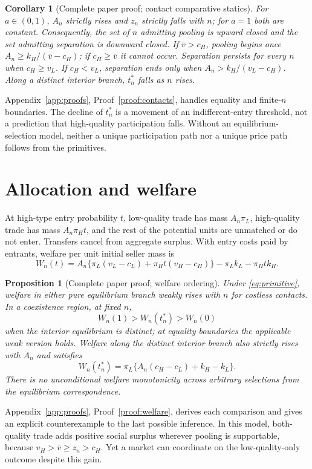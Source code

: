 \documentclass[11pt]{article}
\newtheorem{proposition}{Proposition}
\newtheorem{corollary}{Corollary}
\begin{document}
\begin{corollary}[Complete paper proof; contact comparative statics]\label{cor:contacts}
For $a\in(0,1)$, $A_n$ strictly rises and $z_n$ strictly falls with $n$; for $a=1$ both are constant. Consequently, the set of $n$ admitting pooling is upward closed and the set admitting separation is downward closed. If $\bar v>c_H$, pooling begins once $A_n\geq k_H/(\bar v-c_H)$; if $c_H\geq\bar v$ it cannot occur. Separation persists for every $n$ when $c_H\geq v_L$. If $c_H<v_L$, separation ends only when $A_n>k_H/(v_L-c_H)$. Along a distinct interior branch, $t_n^*$ falls as $n$ rises.
\end{corollary}
Appendix~\ref{app:proofs}, Proof~\ref{proof:contacts}, handles equality and finite-$n$ boundaries. The decline of $t_n^*$ is a movement of an indifferent-entry threshold, not a prediction that high-quality participation falls. Without an equilibrium-selection model, neither a unique participation path nor a unique price path follows from the primitives.

\section{Allocation and welfare}\label{sec:welfare}

At high-type entry probability $t$, low-quality trade has mass $A_n\pi_L$, high-quality trade has mass $A_n\pi_Ht$, and the rest of the potential units are unmatched or do not enter. Transfers cancel from aggregate surplus. With entry costs paid by entrants, welfare per unit initial seller mass is
\begin{equation}\label{eq:welfare}
 W_n(t)=A_n\{\pi_L(v_L-c_L)+\pi_Ht(v_H-c_H)\}
           -\pi_Lk_L-\pi_Ht k_H.
\end{equation}

\begin{proposition}[Complete paper proof; welfare ordering]\label{prop:welfare}
Under \eqref{eq:primitive}, welfare in either pure equilibrium branch weakly rises with $n$ for costless contacts. In a coexistence region, at fixed $n$,
\begin{equation}\label{eq:worder}
 W_n(1)>W_n(t_n^*)>W_n(0)
\end{equation}
when the interior equilibrium is distinct; at equality boundaries the applicable weak version holds. Welfare along the distinct interior branch also strictly rises with $A_n$ and satisfies
\begin{equation}\label{eq:wmix}
 W_n(t_n^*)=\pi_L\{A_n(c_H-c_L)+k_H-k_L\}.
\end{equation}
There is no unconditional welfare monotonicity across arbitrary selections from the equilibrium correspondence.
\end{proposition}
Appendix~\ref{app:proofs}, Proof~\ref{proof:welfare}, derives each comparison and gives an explicit counterexample to the last possible inference. In this model, both-quality trade adds positive social surplus wherever pooling is supportable, because $v_H>\bar v\geq z_n>c_H$. Yet a market can coordinate on the low-quality-only outcome despite this gain.
\end{document}
